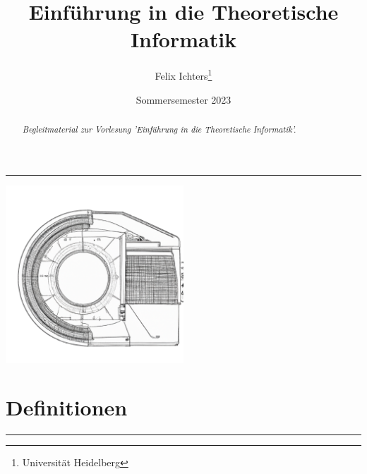 \documentclass[DIV=12]{scrartcl}
\title{Einführung in die Theoretische Informatik}
\author{Felix Ichters\thanks{Universität Heidelberg}}
\date{Sommersemester 2023}
\begin{document}
\maketitle
\rule{\textwidth}{0.4pt}
\begin{abstract}
\begin{flushright}
    \textit{Begleitmaterial zur Vorlesung 'Einführung in die Theoretische Informatik'.}
\end{flushright}    
\end{abstract}
\par\bigskip
\begin{center}
\includegraphics[width=0.5\textwidth]{dall2.png}    
\end{center}

\newpage
\tableofcontents
\newpage
\part{Definitionen}
\rule{\textwidth}{0.4pt}
\newpage
\end{document}
